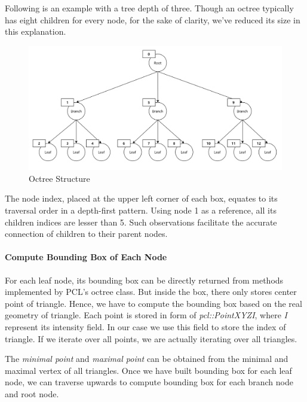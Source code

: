 \documentclass[11pt, a4paper,oneside,chapterprefix=false]{scrbook}
\begin{document}
Following is an example with a tree depth of three. Though an octree typically has eight children for every node, for the sake of clarity, we've reduced its size in this explanation. 

\begin{figure}[H]
    \centering
    \includegraphics*[width=1.0\textwidth]{figures/octree.png}
    \caption{Octree Structure}
    \label{fig:octree structure}
\end{figure}


The node index, placed at the upper left corner of each box, equates to its traversal order in a depth-first pattern. Using node 1 as a reference, all its children indices are lesser than 5. Such observations facilitate the accurate connection of children to their parent nodes.

\paragraph{Compute Bounding Box of Each Node}

For each leaf node, its bounding box can be directly returned from methods implemented by PCL's octree class. But inside the box, there only stores center point of triangle. Hence, we have to compute the bounding box based on the real geometry of triangle. Each point is stored in form of \emph{pcl::PointXYZI}, where \emph{I} represent its intensity field. In our case we use this field to store the index of triangle. If we iterate over all points, we are actually iterating over all triangles. 

\vspace{10pt}

The \emph{minimal point} and \emph{maximal point} can be obtained from the minimal and maximal vertex of all triangles. Once we have built bounding box for each leaf node, we can traverse upwards to compute bounding box for each branch node and root node. 
\end{document}
